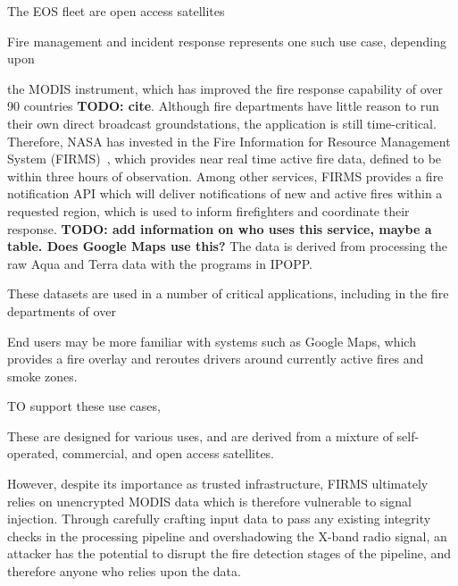 The EOS fleet are open access satellites

Fire management and incident response represents one such use case, depending upon

the MODIS instrument, which has improved the fire response capability of over 90 countries \textbf{TODO: cite}.
Although fire departments have little reason to run their own direct broadcast groundstations, the application is still time-critical.
Therefore, NASA has invested in the Fire Information for Resource Management System (FIRMS)~\cite{firmsIndex}, which provides near real time active fire data, defined to be within three hours of observation.
Among other services, FIRMS provides a fire notification API which will deliver notifications of new and active fires within a requested region, which is used to inform firefighters and coordinate their response.
\textbf{TODO: add information on who uses this service, maybe a table. Does Google Maps use this?}
The data is derived from processing the raw Aqua and Terra data with the programs in IPOPP.




These datasets are used in a number of critical applications, including in the fire departments of over 

End users may be more familiar with systems such as Google Maps, which provides a fire overlay and reroutes drivers around currently active fires and smoke zones.

TO support these use cases,

These are designed for various uses, and are derived from a mixture of self-operated, commercial, and open access satellites.


However, despite its importance as trusted infrastructure, FIRMS ultimately relies on unencrypted MODIS data which is therefore vulnerable to signal injection.
Through carefully crafting input data to pass any existing integrity checks in the processing pipeline and overshadowing the X-band radio signal, an attacker has the potential to disrupt the fire detection stages of the pipeline, and therefore anyone who relies upon the data.


